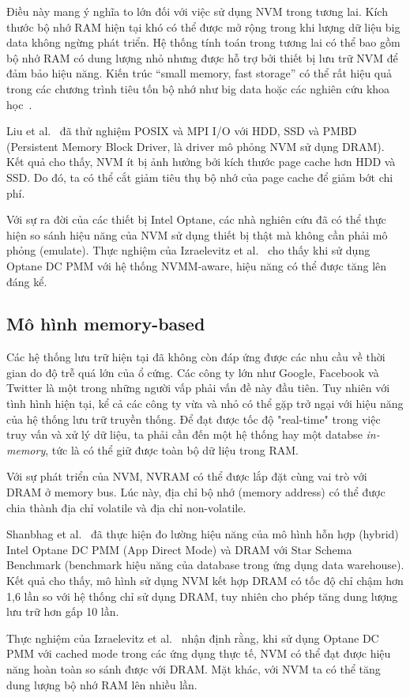 Điều này mang ý nghĩa to lớn đối với việc sử dụng NVM trong tương lai. Kích
thước bộ nhớ RAM hiện tại khó có thể được mở rộng trong khi lượng dữ liệu big
data không ngừng phát triển. Hệ thống tính toán trong tương lai có thể bao gồm
bộ nhớ RAM có dung lượng nhỏ nhưng được hỗ trợ bởi thiết bị lưu trữ NVM để đảm
bảo hiệu năng. Kiến trúc ``small memory, fast storage'' có thể rất hiệu quả
trong các chương trình tiêu tốn bộ nhớ như big data hoặc các nghiên cứu khoa
học~\cite{bahnImplicationsNVMBased2020}.

Liu et al.~\cite{liuPerformanceEvaluationModeling2017} đã thử nghiệm POSIX và
MPI I/O với HDD, SSD và PMBD (Persistent Memory Block Driver, là driver mô phỏng
NVM sử dụng DRAM). Kết quả cho thấy, NVM ít bị ảnh hưởng bởi kích thước page
cache hơn HDD và SSD. Do đó, ta có thể cắt giảm tiêu thụ bộ nhớ của page cache
để giảm bớt chi phí.

Với sự ra đời của các thiết bị Intel Optane, các nhà nghiên cứu đã có thể thực
hiện so sánh hiệu năng của NVM sử dụng thiết bị thật mà không cần phải mô phỏng
(emulate). Thực nghiệm của Izraelevitz et
al.~\cite{izraelevitzBasicPerformanceMeasurements2019} cho thấy khi sử dụng
Optane DC PMM với hệ thống NVMM-aware, hiệu năng có thể được tăng lên đáng kể.

\subsection{Mô hình memory-based}
Các hệ thống lưu trữ hiện tại đã không còn đáp ứng được các nhu cầu về thời gian
do độ trễ quá lớn của ổ cứng. Các công ty lớn như Google, Facebook và Twitter là
một trong những người vấp phải vấn đề này đầu tiên. Tuy nhiên với tình hình hiện
tại, kể cả các công ty vừa và nhỏ có thể gặp trở ngại với hiệu năng của hệ thống
lưu trữ truyền thống. Để đạt được tốc độ "real-time" trong việc truy vấn và xử
lý dữ liệu, ta phải cần đến một hệ thống hay một databse \textit{in-memory}, tức
là có thể giữ được toàn bộ dữ liệu trong RAM.

Với sự phát triển của NVM, NVRAM có thể được lắp đặt cùng vai trò với DRAM ở
memory bus. Lúc này, địa chỉ bộ nhớ (memory address) có thể được chia thành địa
chỉ volatile và địa chỉ non-volatile.

Shanbhag et al.~\cite{shanbhagLargescaleInmemoryAnalytics2020} đã
thực hiện đo lường hiệu năng của mô hình hỗn hợp (hybrid) Intel Optane DC PMM
(App Direct Mode) và DRAM với Star Schema Benchmark (benchmark hiệu năng của
database trong ứng dụng data warehouse). Kết quả cho thấy, mô hình sử dụng NVM
kết hợp DRAM có tốc độ chỉ chậm hơn 1,6 lần so với hệ thống chỉ sử dụng DRAM,
tuy nhiên cho phép tăng dung lượng lưu trữ hơn gấp 10 lần.

Thực nghiệm của Izraelevitz et
al.~\cite{izraelevitzBasicPerformanceMeasurements2019} nhận định rằng, khi sử
dụng Optane DC PMM với cached mode trong các ứng dụng thực tế, NVM có thể đạt
được hiệu năng hoàn toàn so sánh được với DRAM. Mặt khác, với NVM ta có thể tăng
dung lượng bộ nhớ RAM lên nhiều lần.
